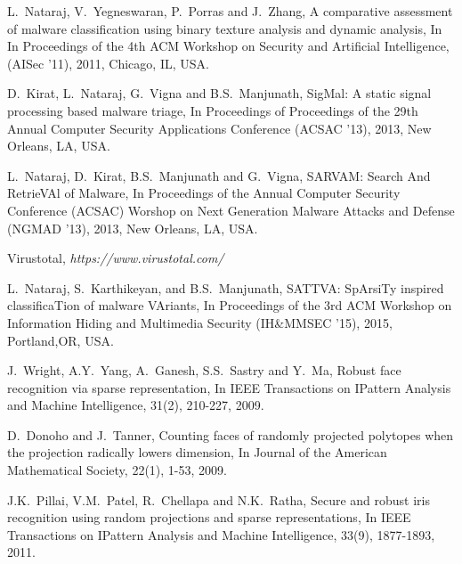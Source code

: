 \documentclass[journal]{IEEEtran}
\begin{document}
\begin{thebibliography}{1}
L.~Nataraj, V.~Yegneswaran, P.~Porras and J.~Zhang, A comparative assessment of malware classification using binary texture analysis and dynamic analysis, In In Proceedings of the 4th ACM Workshop on Security and Artificial Intelligence, (AISec '11), 2011, Chicago, IL, USA.

D.~Kirat, L.~Nataraj, G.~Vigna and B.S.~Manjunath, SigMal: A static signal processing based malware triage, In Proceedings of Proceedings of the 29th Annual Computer Security Applications Conference (ACSAC '13), 2013, New Orleans, LA, USA.


L.~Nataraj, D.~Kirat, B.S.~Manjunath and G.~Vigna, SARVAM: Search And RetrieVAl of Malware, In Proceedings of the Annual Computer Security Conference (ACSAC) Worshop on Next Generation Malware Attacks and Defense (NGMAD '13), 2013, New Orleans, LA, USA.



Virustotal, {\it https://www.virustotal.com/}

L.~Nataraj, S.~Karthikeyan, and B.S.~Manjunath, SATTVA: SpArsiTy inspired classificaTion of malware VAriants, In Proceedings of the 3rd ACM Workshop on Information Hiding and Multimedia Security (IH\&MMSEC '15), 2015, Portland,OR, USA.





J.~Wright, A.Y.~Yang, A.~Ganesh, S.S.~Sastry and Y.~Ma, Robust face recognition via sparse representation, In IEEE Transactions on IPattern Analysis and Machine Intelligence, 31(2), 210-227, 2009. 

D.~Donoho and J.~Tanner, Counting faces of randomly projected polytopes when the projection radically lowers dimension, In Journal of the American Mathematical Society, 22(1), 1-53, 2009. 



J.K.~Pillai, V.M.~Patel, R.~Chellapa and N.K.~Ratha, Secure and robust iris recognition using random projections and sparse representations, In IEEE Transactions on IPattern Analysis and Machine Intelligence, 33(9), 1877-1893, 2011. 


\end{thebibliography}
\end{document}
